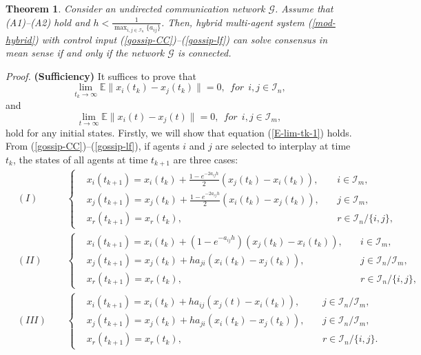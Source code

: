 \documentclass[12pt,draftcls,onecolumn]{IEEEtran}
\newtheorem{theorem}{Theorem}
\begin{document}
\begin{theorem}\label{consensus-gossip}
Consider an undirected communication network $\mathscr{G}$. Assume that (A1)--(A2) hold and $h<\frac{1}{\max_{i,j\in \mathcal{I}_n}\{a_{ij}\}}$. Then, hybrid multi-agent system (\ref{mod-hybrid}) with control input (\ref{gossip-CC})--(\ref{gossip-lf}) can solve consensus in mean sense if and only if the network $\mathscr{G}$ is connected.
\end{theorem}
{\it Proof.} \textbf{(Sufficiency)} It suffices to prove that
\begin{equation}\label{E-lim-tk-1}
\lim_{t_{k} \to \infty }\mathbb{E}\|x_{i}(t_{k})-x_{j}(t_{k})\|=0, ~~for~~i,j\in \mathcal{I}_{n},
\end{equation}
and
\begin{equation}\label{E-lim-t-1}
   \lim_{t \to \infty }\mathbb{E}\|x_{i}(t)-x_{j}(t)\|=0, ~~for~~i,j\in \mathcal{I}_{m},
\end{equation}
hold for any initial states.
Firstly, we will show that equation (\ref{E-lim-tk-1}) holds. From (\ref{gossip-CC})--(\ref{gossip-lf}), if agents $i$ and $j$ are selected to interplay at time $t_{k}$, the states of all agents at time $t_{k+1}$ are three cases:
\begin{subequations}\label{gossip-states}
\begin{align}
&(I)~~&&
\left\{
\begin{aligned}
&x_i(t_{k+1})=x_i(t_{k})+\frac{1-e^{-2a_{ij}h}}{2}(x_j(t_{k})-x_i(t_{k})),~&&i\in \mathcal{I}_m,\\
&x_j(t_{k+1})=x_j(t_{k})+\frac{1-e^{-2a_{ij}h}}{2}(x_i(t_{k})-x_j(t_{k})),~&&j\in \mathcal{I}_m,\\
&x_r(t_{k+1})=x_r(t_{k}),~~&&r\in\mathcal{I}_n/\{i,j\},
\end{aligned}
\right. \label{GS-CC} \\
&(II)~~&&
\left\{
\begin{aligned}
&x_i(t_{k+1})=x_i(t_k)+(1-e^{-a_{ij}h})(x_j(t_k)-x_i(t_k)),~&&i\in \mathcal{I}_m,\\
&x_j(t_{k+1})=x_j(t_{k})+ha_{ji}(x_i(t_k)-x_j(t_k)),&&j\in \mathcal{I}_{n}/\mathcal{I}_{m},\\
&x_r(t_{k+1})=x_r(t_{k}),~~&&r\in\mathcal{I}_n/\{i,j\},
\end{aligned}
\right.\label{GS-CD}\\
&(III)~~&&
\left\{
\begin{aligned}
&x_i(t_{k+1})=x_i(t_k)+ha_{ij}(x_j(t)-x_i(t_k)),~&&j\in \mathcal{I}_{n}/\mathcal{I}_{m},\\
&x_j(t_{k+1})=x_j(t_k)+ha_{ji}(x_i(t_k)-x_j(t_k)),~&&j\in \mathcal{I}_{n}/\mathcal{I}_{m},\\
&x_r(t_{k+1})=x_r(t_{k}),~~&&r\in\mathcal{I}_n/\{i,j\}.
\end{aligned}
\right.\label{GS-DD}
\end{align}
\end{subequations}
\end{document}
